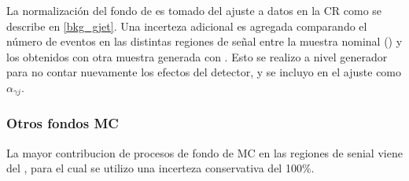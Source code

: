 La normalización del fondo de {\gjet} es tomado del ajuste a datos en la CR
como se describe en \cref{bkg_gjet}. Una incerteza adicional es agregada comparando el
número de eventos en las distintas regiones de señal entre la muestra nominal
(\sherpa) y los obtenidos con otra muestra generada con {\pythia}.
Esto se realizo a nivel generador para no contar nuevamente los efectos del
detector, y se incluyo en el ajuste como $\alpha_{\gamma j}$.


\subsubsection{Otros fondos MC}

La mayor contribucion de procesos de fondo de MC en las regiones de senial viene
del {\zgam}, para el cual se utilizo una incerteza conservativa del 100\%.






